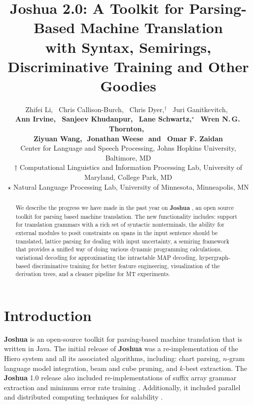 \documentclass[11pt]{article}
\title{Joshua 2.0: A Toolkit for Parsing-Based Machine Translation \\with Syntax, Semirings, Discriminative Training and Other Goodies }
\author{
Zhifei Li,\,\,\,
Chris Callison-Burch,\,\,\,
Chris Dyer,$^\dagger$\,\,\,
Juri Ganitkevitch,\,\,\,
\\ {\bf
Ann Irvine,\,\,\,  
Sanjeev Khudanpur,\,\,\,
Lane Schwartz,$^\star$\,\,\, 
Wren N.\,G.\,Thornton,\,\,\,}
\\ {\bf
Ziyuan Wang,\,\,
Jonathan Weese\,\,
{\textnormal{and}}
\,\,\,Omar F. Zaidan
}\\
Center for Language and Speech Processing, Johns Hopkins University, Baltimore, MD\\
$\dagger$ Computational Linguistics and Information Processing Lab, University of Maryland, College Park, MD\\
$\star$ Natural Language Processing Lab, University of Minnesota, Minneapolis, MN }
\date{}
\newcommand{\joshua}{\textbf{Joshua}\xspace}
\begin{document}
\maketitle
\begin{abstract}
We describe the progress we have made in the past year on \textbf{Joshua} \cite{joshua-wmt09}, 
an open source toolkit for parsing based machine translation.
The new functionality includes: 
support for translation grammars with a rich set of syntactic nonterminals,
the ability for external modules to posit constraints on spans in the input sentence should be translated,  
lattice parsing for dealing with input uncertainty,
a semiring framework that provides a unified way of doing various dynamic programming calculations, 
variational decoding for approximating the intractable MAP decoding,
hypergraph-based discriminative training for better feature engineering, 
visualization of the derivation trees, 
and a cleaner pipeline for MT experiments.
\end{abstract}



\section{Introduction}

\textbf{Joshua} is an open-source toolkit for parsing-based machine translation that is written in Java. The initial release of \joshua  \cite{joshua-wmt09} was a re-implementation of the Hiero system \cite{hiero-2007} and all its associated algorithms, including: chart parsing, $n$-gram language model integration, beam and cube pruning, and $k$-best extraction.  The \joshua 1.0 release also included re-implementations of suffix array grammar extraction \cite{lopez:2007:EMNLP-CoNLL2007,PBML-2010-Joshua-grammar-extraction}  and minimum error rate training \cite{och-mert,Zaidan2009}.  Additionally, it included parallel and distributed computing techniques for salability \cite{Joshua-old}. 
\end{document}
